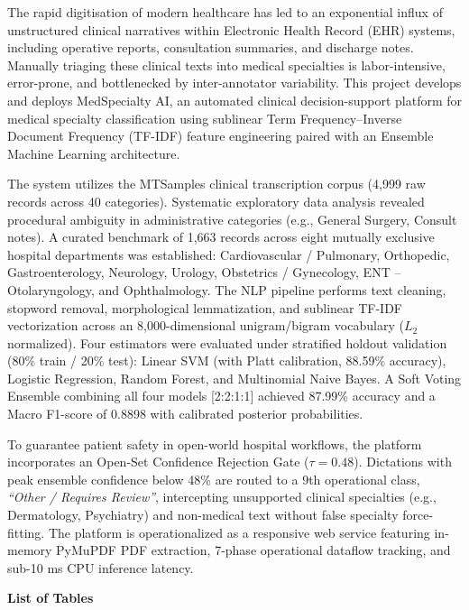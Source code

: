 The rapid digitisation of modern healthcare has led to an exponential influx of unstructured clinical narratives within Electronic Health Record (EHR) systems, including operative reports, consultation summaries, and discharge notes. Manually triaging these clinical texts into medical specialties is labor-intensive, error-prone, and bottlenecked by inter-annotator variability. This project develops and deploys MedSpecialty AI, an automated clinical decision-support platform for medical specialty classification using sublinear Term Frequency--Inverse Document Frequency (TF-IDF) feature engineering paired with an Ensemble Machine Learning architecture.

The system utilizes the MTSamples clinical transcription corpus (4,999 raw records across 40 categories). Systematic exploratory data analysis revealed procedural ambiguity in administrative categories (e.g., General Surgery, Consult notes). A curated benchmark of 1,663 records across eight mutually exclusive hospital departments was established: Cardiovascular / Pulmonary, Orthopedic, Gastroenterology, Neurology, Urology, Obstetrics / Gynecology, ENT -- Otolaryngology, and Ophthalmology. The NLP pipeline performs text cleaning, stopword removal, morphological lemmatization, and sublinear TF-IDF vectorization across an 8,000-dimensional unigram/bigram vocabulary ($L_2$ normalized). Four estimators were evaluated under stratified holdout validation (80\% train / 20\% test): Linear SVM (with Platt calibration, 88.59\% accuracy), Logistic Regression, Random Forest, and Multinomial Naive Bayes. A Soft Voting Ensemble combining all four models [2:2:1:1] achieved 87.99\% accuracy and a Macro F1-score of 0.8898 with calibrated posterior probabilities.

To guarantee patient safety in open-world hospital workflows, the platform incorporates an Open-Set Confidence Rejection Gate ($\tau = 0.48$). Dictations with peak ensemble confidence below 48\% are routed to a 9th operational class, \textit{``Other / Requires Review''}, intercepting unsupported clinical specialties (e.g., Dermatology, Psychiatry) and non-medical text without false specialty force-fitting. The platform is operationalized as a responsive web service featuring in-memory PyMuPDF PDF extraction, 7-phase operational dataflow tracking, and sub-10 ms CPU inference latency.

\clearpage

{}
\thispagestyle{plain}
\begingroup
\renewcommand{\section}[2]{}
\begin{center}
    \textbf{\Large List of Tables}
\end{center}
\vspace{0.4cm}
\listoftables
\endgroup

